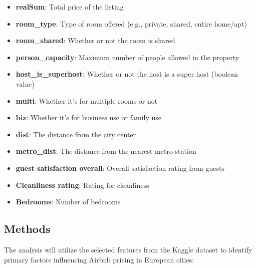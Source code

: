 \documentclass[12pt, letterpaper]{article}
\begin{document}
\begin{itemize}
  \item \textbf{realSum}: Total price of the listing
  \item \textbf{room\_type}: Type of room offered (e.g., private, shared, entire home/apt)
  \item \textbf{room\_shared}: Whether or not the room is shared
  \item \textbf{person\_capacity}: Maximum number of people allowed in the property
  \item \textbf{host\_is\_superhost}: Whether or not the host is a super host (boolean value)
  \item \textbf{multi}: Whether it's for multiple rooms or not
  \item \textbf{biz}: Whether it's for business use or family use
  \item \textbf{dist}: The distance from the city center
  \item \textbf{metro\_dist}: The distance from the nearest metro station
  \item \textbf{guest satisfaction overall}: Overall satisfaction rating from guests
  \item \textbf{Cleanliness rating}: Rating for cleanliness
  \item \textbf{Bedrooms}: Number of bedrooms
\end{itemize}

\subsection*{Methods}
The analysis will utilize the selected features from the Kaggle dataset to identify primary factors influencing Airbnb pricing in European cities:
\end{document}

